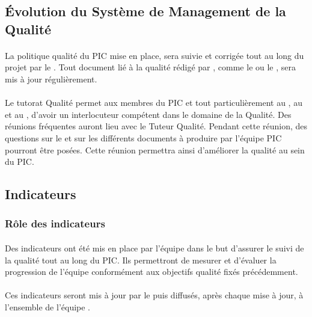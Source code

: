 \subsection{Évolution du Système de Management de la Qualité}
\label{Evolution du systeme de management de la qualite}

\paragraph*{} La politique qualité du PIC \nomEquipe{} mise en place, sera suivie et corrigée tout au long
du projet par le \RQ . Tout document lié à la qualité rédigé par \nomEquipe,
comme le \PQ{} ou le \PGC , sera mis à jour régulièrement.
\paragraph*{} Le tutorat Qualité permet aux membres du PIC et tout particulièrement au \CP, au
\RQ{} et au \RGC , d’avoir un interlocuteur
compétent dans le domaine de la Qualité. Des réunions fréquentes auront lieu avec le
Tuteur Qualité. Pendant cette réunion, des questions sur le \SMQ{} et sur les différents documents à produire par l’équipe PIC pourront être posées.
Cette réunion permettra ainsi d’améliorer la qualité au sein du PIC.


\subsection{Indicateurs}
\label{Indicateurs}
\subsubsection*{Rôle des indicateurs}
\label{Role des indicateurs}

\paragraph*{} Des indicateurs ont été mis en place par l'équipe \nomEquipe{} dans le but d'assurer le suivi
de la qualité tout au long du PIC. Ils permettront de mesurer et d'évaluer la progression de
l'équipe conformément aux objectifs qualité fixés précédemment.

\paragraph*{} Ces indicateurs seront mis à jour par le \RQ{} puis diffusés, après chaque
mise à jour, à l'ensemble de l'équipe \nomEquipe .


